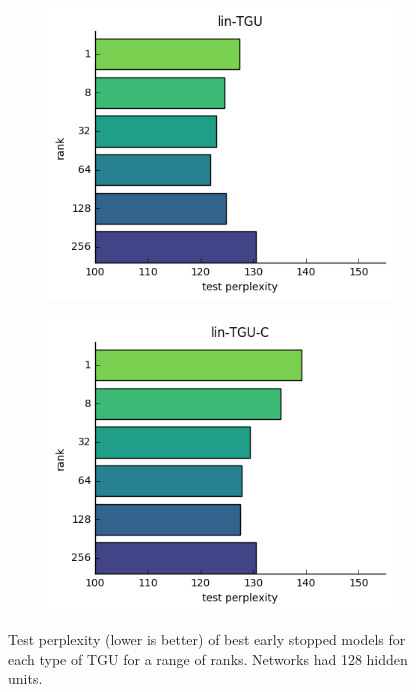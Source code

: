 \begin{figure}
\begin{subfigure}[t]{0.45\textwidth}
	\includegraphics[width=\textwidth]{exps/ptb/lintgu-rank}
\end{subfigure}
\begin{subfigure}[t]{0.45\textwidth}
	\includegraphics[width=\textwidth]{exps/ptb/lintguc-rank}
\end{subfigure}

\caption[TGU PTB results by rank]{Test perplexity (lower is better)
 of best early stopped models for
each type of TGU for a range of ranks. Networks had 128 hidden units.}
\label{fig:ptbtgurank}
\end{figure}

